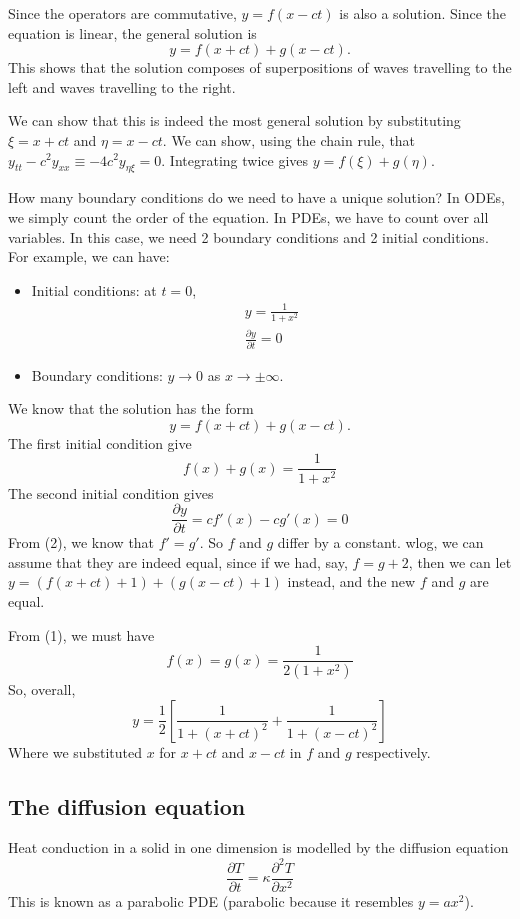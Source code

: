 \documentclass[a4paper]{article}
\begin{document}
Since the operators are commutative, $y = f(x - ct)$ is also a solution. Since the equation is linear, the general solution is
\[
  y = f(x + ct) + g(x - ct).
\]
This shows that the solution composes of superpositions of waves travelling to the left and waves travelling to the right.

We can show that this is indeed the most general solution by substituting $\xi = x + ct$ and $\eta = x - ct$. We can show, using the chain rule, that $y_{tt} - c^2 y_{xx} \equiv -4c^2 y_{\eta\xi} = 0$. Integrating twice gives $y = f(\xi) + g(\eta)$.

How many boundary conditions do we need to have a unique solution? In ODEs, we simply count the order of the equation. In PDEs, we have to count over all variables. In this case, we need 2 boundary conditions and 2 initial conditions. For example, we can have:
\begin{itemize}
  \item Initial conditions: at $t = 0$,
    \begin{gather*}
      y = \frac{1}{1 + x^2}\\
      \frac{\partial y}{\partial t} = 0
    \end{gather*}
  \item Boundary conditions: $y \to 0$ as $x \to \pm \infty$.
\end{itemize}
We know that the solution has the form
\[
  y = f(x + ct) + g(x - ct).
\]
The first initial condition give
\[
  f(x) + g(x) = \frac{1}{1 + x^2}\tag{1}
\]
The second initial condition gives
\[
  \frac{\partial y}{\partial t} = cf'(x) - cg'(x)\tag{2} = 0
\]
From (2), we know that $f' = g'$. So $f$ and $g$ differ by a constant. wlog, we can assume that they are indeed equal, since if we had, say, $f = g + 2$, then we can let $y = (f(x + ct) + 1) + (g(x - ct) + 1)$ instead, and the new $f$ and $g$ are equal.

From (1), we must have
\[
  f(x) = g(x) = \frac{1}{2(1 + x^2)}
\]
So, overall,
\[
  y = \frac{1}{2}\left[\frac{1}{1 + (x + ct)^2} + \frac{1}{1 + (x - ct)^2}\right]
\]
Where we substituted $x$ for $x +ct$ and $x - ct$ in $f$ and $g$ respectively.

\subsection{The diffusion equation}
Heat conduction in a solid in one dimension is modelled by the diffusion equation
\[
  \frac{\partial T}{\partial t} = \kappa \frac{\partial^2 T}{\partial x^2}
\]
This is known as a parabolic PDE (parabolic because it resembles $y = ax^2$).
\end{document}
